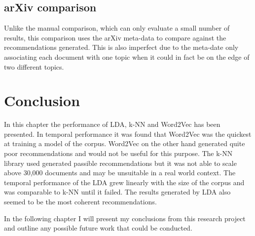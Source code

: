 \subsection{arXiv comparison}
Unlike the manual comparison, which can only evaluate a small number of results, this comparison uses the arXiv meta-data to compare against the recommendations generated.
This is also imperfect due to the meta-date only associating each document with one topic when it could in fact be on the edge of two different topics.

\section{Conclusion}
In this chapter the performance of LDA, k-NN and Word2Vec has been presented.
In temporal performance it was found that Word2Vec was the quickest at training a model of the corpus.
Word2Vec on the other hand generated quite poor recommendations and would not be useful for this purpose.
The k-NN library used generated passible recommendations but it was not able to scale above 30,000 documents and may be unsuitable in a real world context.
The temporal performance of the LDA grew linearly with the size of the corpus and was comparable to k-NN until it failed.
The results generated by LDA also seemed to be the most coherent recommendations.

In the following chapter I will present my conclusions from this research project and outline any possible future work that could be conducted.
